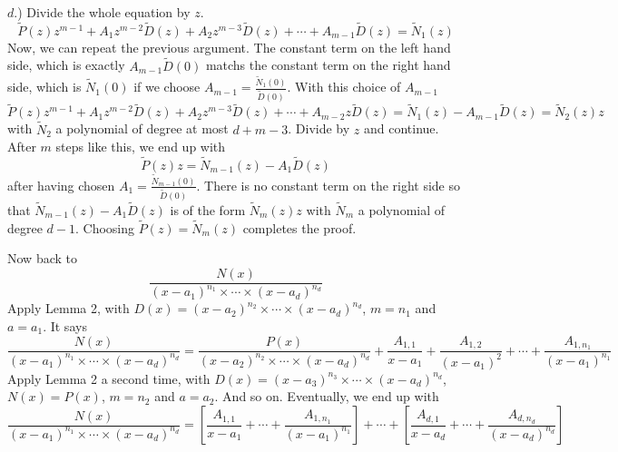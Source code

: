 \(d\).) Divide the whole equation by \(z\).
\[
\tilde{P}(z)z^{m-1} + A_1 z^{m-2} \tilde{D}(z) + A_2 z^{m-3} \tilde{D}(z) + \cdots + A_{m-1} \tilde{D}(z) = \tilde{N}_1(z)
\]
Now, we can repeat the previous argument. The constant term on the left hand side, which
is exactly \(A_{m-1} \tilde{D}(0)\) matchs the constant term on the right hand side, which is \(\tilde{N}_1(0)\) if we
choose \(A_{m-1} = \frac{\tilde{N}_1(0)}{\tilde{D}(0)}\). With this choice of \(A_{m-1}\)
\[
\tilde{P}(z)z^{m-1} + A_1 z^{m-2} \tilde{D}(z) + A_2 z^{m-3} \tilde{D}(z) + \cdots + A_{m-2} z \tilde{D}(z) = \tilde{N}_1(z) - A_{m-1} \tilde{D}(z) = \tilde{N}_2(z)z
\]
with \(\tilde{N}_2\) a polynomial of degree at most \(d + m - 3\). Divide by \(z\) and continue. After \(m\) steps
like this, we end up with
\[
\tilde{P}(z)z = \tilde{N}_{m-1}(z) - A_1 \tilde{D}(z)
\]
after having chosen \(A_1 = \frac{\tilde{N}_{m-1}(0)}{\tilde{D}(0)}\). There is no constant term on the right side so that
\(\tilde{N}_{m-1}(z) - A_1 \tilde{D}(z)\) is of the form \(\tilde{N}_m(z)z\) with \(\tilde{N}_m\) a polynomial of degree \(d - 1\). Choosing
\(\tilde{P}(z) = \tilde{N}_m(z)\) completes the proof.

Now back to
\[
\frac{N(x)}{(x-a_1)^{n_1} \times \cdots \times (x-a_d)^{n_d}}
\]
Apply Lemma 2, with \(D(x) = (x - a_2)^{n_2} \times \cdots \times (x - a_d)^{n_d}\), \(m = n_1\) and \(a = a_1\). It says
\[
\frac{N(x)}{(x-a_1)^{n_1} \times \cdots \times (x-a_d)^{n_d}} = \frac{P(x)}{(x-a_2)^{n_2} \times \cdots \times (x-a_d)^{n_d}} + \frac{A_{1,1}}{x-a_1} + \frac{A_{1,2}}{(x-a_1)^2} + \cdots + \frac{A_{1,n_1}}{(x-a_1)^{n_1}}
\]
Apply Lemma 2 a second time, with \(D(x) = (x - a_3)^{n_3} \times \cdots \times (x - a_d)^{n_d}\), \(N(x) = P(x)\),
\(m = n_2\) and \(a = a_2\). And so on. Eventually, we end up with
\[
\frac{N(x)}{(x-a_1)^{n_1} \times \cdots \times (x-a_d)^{n_d}} = \left[ \frac{A_{1,1}}{x-a_1} + \cdots + \frac{A_{1,n_1}}{(x-a_1)^{n_1}} \right] + \cdots + \left[ \frac{A_{d,1}}{x-a_d} + \cdots + \frac{A_{d,n_d}}{(x-a_d)^{n_d}} \right]
\]

\newpage